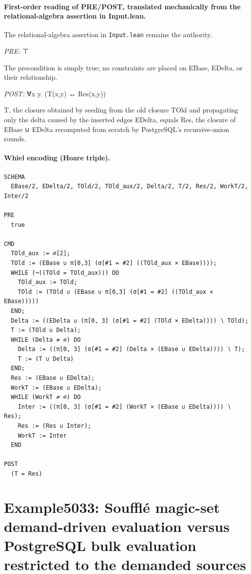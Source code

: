 \documentclass[10pt]{article}
\begin{document}
\paragraph{First-order reading of PRE/POST, translated mechanically from the relational-algebra assertion in Input.lean.} The relational-algebra assertion in \texttt{Input.lean} remains the authority.

\textit{PRE:} ⊤\par The precondition is simply true; no constraints are placed on EBase, EDelta, or their relationship.

\textit{POST:} ∀x y. (T(x,y) ↔ Res(x,y))\par T, the closure obtained by seeding from the old closure TOld and propagating only the delta caused by the inserted edges EDelta, equals Res, the closure of EBase ∪ EDelta recomputed from scratch by PostgreSQL's recursive-union rounds.

\paragraph{Whiel encoding (Hoare triple).}

\begin{Verbatim}[fontsize=\scriptsize,breaklines=true,breakanywhere=true,frame=single,framesep=1.5mm]
SCHEMA
  EBase/2, EDelta/2, TOld/2, TOld_aux/2, Delta/2, T/2, Res/2, WorkT/2, Inter/2

PRE
  true

CMD
  TOld_aux := ∅[2];
  TOld := (EBase ∪ π[0,3] (σ[#1 = #2] ((TOld_aux × EBase))));
  WHILE (¬((TOld = TOld_aux))) DO
    TOld_aux := TOld;
    TOld := (TOld ∪ (EBase ∪ π[0,3] (σ[#1 = #2] ((TOld_aux × EBase)))))
  END;
  Delta := ((EDelta ∪ (π[0, 3] (σ[#1 = #2] (TOld × EDelta)))) ∖ TOld);
  T := (TOld ∪ Delta);
  WHILE (Delta ≠ ∅) DO
    Delta := ((π[0, 3] (σ[#1 = #2] (Delta × (EBase ∪ EDelta)))) ∖ T);
    T := (T ∪ Delta)
  END;
  Res := (EBase ∪ EDelta);
  WorkT := (EBase ∪ EDelta);
  WHILE (WorkT ≠ ∅) DO
    Inter := ((π[0, 3] (σ[#1 = #2] (WorkT × (EBase ∪ EDelta)))) ∖ Res);
    Res := (Res ∪ Inter);
    WorkT := Inter
  END

POST
  (T = Res)
\end{Verbatim}

\Needspace{0.45\textheight}

\section{Example5033: Soufflé magic-set demand-driven evaluation versus PostgreSQL bulk evaluation restricted to the demanded sources}\label{case:Example5033}
\end{document}
